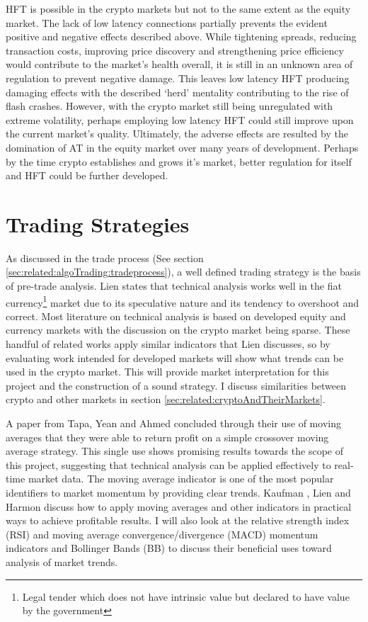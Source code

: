 HFT is possible in the crypto markets but not to the same extent as the equity market. The lack of low latency connections partially prevents the evident positive and negative effects described above. While tightening spreads, reducing transaction costs, improving price discovery and strengthening price efficiency would contribute to the market's health overall, it is still in an unknown area of regulation to prevent negative damage. This leaves low latency HFT producing damaging effects with the described `herd' mentality contributing to the rise of flash crashes.  However, with the crypto market still being unregulated with extreme volatility, perhaps employing low latency HFT could still improve upon the current market's quality. Ultimately, the adverse effects are resulted by the domination of AT in the equity market over many years of development. Perhaps by the time crypto establishes and grows it's market, better regulation for itself and HFT could be further developed.



\section{Trading Strategies}
\label{sec:related:tradingStrategies}
\noindent As discussed in the trade process (See section \ref{sec:related:algoTrading:tradeprocess}), a well defined trading strategy is the basis of pre-trade analysis. Lien \cite{BOOK:Lien:2016} states that technical analysis works well in the fiat currency\footnote{Legal tender which does not have intrinsic value but declared to have value by the government} market due to its speculative nature and its tendency to overshoot and correct.  Most literature on technical analysis is based on developed equity and currency markets with the discussion on the crypto market being sparse. These handful of related works apply similar indicators that Lien discusses, so by evaluating work intended for developed markets will show what trends can be used in the crypto market. This will provide market interpretation for this project and the construction of a sound strategy. I discuss similarities between crypto and other markets in section \ref{sec:related:cryptoAndTheirMarkets}.

A paper from Tapa, Yean and Ahmed \cite{ART:Tapa:2016} concluded through their use of moving averages that they were able to return profit on a simple crossover moving average strategy. This single use shows promising results towards the scope of this project, suggesting that technical analysis can be applied effectively to real-time market data. The moving average indicator is one of the most popular identifiers to market momentum by providing clear trends. Kaufman \cite{BOOK:Kaufman:2013}, Lien \cite{BOOK:Lien:2016} and Harmon \cite{BOOK:Harmon:2014} discuss how to apply moving averages and other indicators in practical ways to achieve profitable results. I will also look at the relative strength index (RSI) and moving average convergence/divergence (MACD) momentum indicators and Bollinger Bands (BB) to discuss their beneficial uses toward analysis of market trends.

